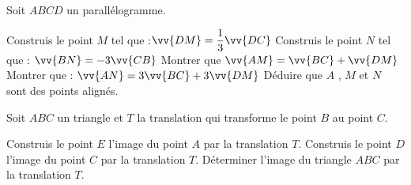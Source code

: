 \documentclass[a4paper,addpoints,12pt]{exam}
\begin{document}
\begin{exo}[5]
\begin{minipage}{.6\linewidth}
Soit $ABCD$ un parallélogramme.
\begin{questions}
\question Construis le point $M$ tel que :$\vv{DM}=\dfrac{1}{3}\vv{DC}$
\question Construis le point $N$ tel que : $\vv{BN}=-3\vv{CB}$
\question Montrer que $\vv{AM}=\vv{BC}+\vv{DM}$
\question Montrer que : $\vv{AN}=3\vv{BC}+3\vv{DM}$
\question Déduire que $A$ , $M$ et $N$ sont des points alignés.
\end{questions}
\end{minipage}%
\begin{minipage}[t]{.4\linewidth}
\end{minipage}
\begin{multicols}{2}
\anserline[10]
\columnbreak

\anserline[10]
\end{multicols}
\end{exo}

\begin{exo}[3]
Soit $ABC$ un triangle et $T$ la translation qui transforme le point $B$ au point $C$.
\begin{questions}
\question Construis le point $E$ l'image du point $A$ par la translation $T$.
\question Construis le point $D$ l'image du point $C$ par la translation $T$.
\question Déterminer l'image du triangle $ABC$ par la translation $T$.
\end{questions}
\end{exo}
\end{document}
